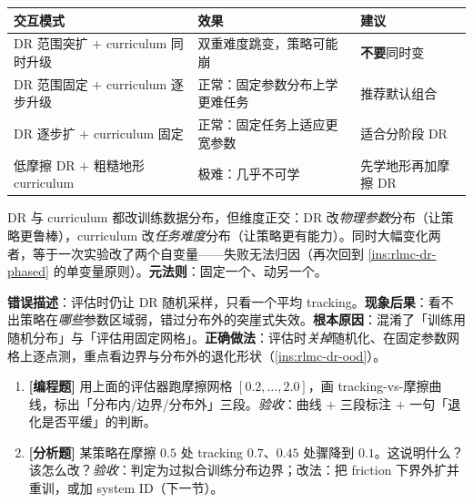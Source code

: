 \begin{center}
\small
\begin{tabular}{@{}p{4.6cm}p{4.0cm}p{3.4cm}@{}}
\toprule
交互模式 & 效果 & 建议 \\
\midrule
DR 范围突扩 $+$ curriculum 同时升级 & 双重难度跳变，策略可能崩 & \textbf{不要}同时变 \\
DR 范围固定 $+$ curriculum 逐步升级 & 正常：固定参数分布上学更难任务 & 推荐默认组合 \\
DR 逐步扩 $+$ curriculum 固定 & 正常：固定任务上适应更宽参数 & 适合分阶段 DR \\
低摩擦 DR $+$ 粗糙地形 curriculum & 极难：几乎不可学 & 先学地形再加摩擦 DR \\
\bottomrule
\end{tabular}
\end{center}

\begin{insight}\label{ins:rlmc-dr-orthogonal}
DR 与 curriculum 都改训练数据分布，但维度正交：DR 改\emph{物理参数}分布（让策略更鲁棒），curriculum 改\emph{任务难度}分布（让策略更有能力）。同时大幅变化两者，等于一次实验改了两个自变量——失败无法归因（再次回到 \cref{ins:rlmc-dr-phased} 的单变量原则）。\textbf{元法则}：固定一个、动另一个。
\end{insight}

\begin{pitfall}
\textbf{错误描述}：评估时仍让 DR 随机采样，只看一个平均 tracking。\textbf{现象后果}：看不出策略在\emph{哪些}参数区域弱，错过分布外的突崖式失效。\textbf{根本原因}：混淆了「训练用随机分布」与「评估用固定网格」。\textbf{正确做法}：评估时\emph{关掉}随机化、在固定参数网格上逐点测，重点看边界与分布外的退化形状（\cref{ins:rlmc-dr-ood}）。
\end{pitfall}

\begin{practice}[本节练习]
\begin{enumerate}
  \item \textbf{[编程题]} 用上面的评估器跑摩擦网格 $[0.2,\dots,2.0]$，画 tracking-vs-摩擦曲线，标出「分布内/边界/分布外」三段。\emph{验收}：曲线 $+$ 三段标注 $+$ 一句「退化是否平缓」的判断。
  \item \textbf{[分析题]} 某策略在摩擦 $0.5$ 处 tracking $0.7$、$0.45$ 处骤降到 $0.1$。这说明什么？该怎么改？\emph{验收}：判定为过拟合训练分布边界；改法：把 friction 下界外扩并重训，或加 system ID（下一节）。
\end{enumerate}
\end{practice}


